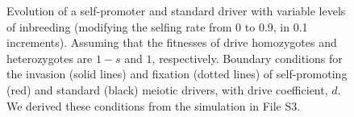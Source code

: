 \documentclass[12pt,letterpaper]{article}
\begin{document}
\begin{figure}
\caption{Evolution of a self-promoter and standard driver with variable levels of inbreeding (modifying the selfing rate from 0 to 0.9, in 0.1 increments). 
	 	Assuming that the fitnesses of drive homozygotes and 
		heterozygotes are $1-s$ and $1$, respectively. 
	 	Boundary conditions for the invasion (solid lines) 
		and fixation (dotted lines) of self-promoting (red) and standard (black) meiotic drivers, 
		with drive coefficient, $d$. 
		We derived these conditions from the simulation in File S3.}
		\label{self}
\end{figure}
\end{document}

